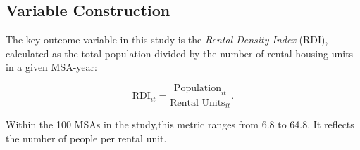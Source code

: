 \documentclass[APA,Times1COL]{WileyNJDv5} %
\begin{document}
\subsection{Variable Construction}
The key outcome variable in this study is the \textit{Rental Density Index} (RDI), calculated as the total population divided by the number of rental housing units in a given MSA-year:

\begin{equation*}
	\text{RDI}_{it} = \frac{\text{Population}_{it}}{\text{Rental Units}_{it}}.
\end{equation*}
	
Within the 100 MSAs in the study,this metric ranges from 6.8 to 64.8. It reflects the number of people per rental unit. 
\begin{figure}[hbt!]
	\centering
	

\end{figure}
\end{document}

